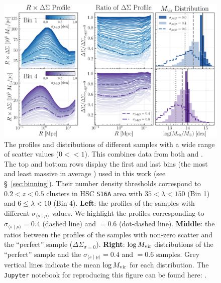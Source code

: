 \documentclass[fleqn,usenatbib,useAMS]{mnras}
\begin{document}
\begin{figure}
    \centering
    \includegraphics[width=\textwidth]{figure/fig_2}
    \caption{
        The \dsigma{} profiles and \mhalo{} distributions of different \topn{} samples with
        a wide range of scatter values ($0<$\scatterMhaloObsSym{}$<1$). 
        This combines data from both  and \smdpl{}. 
        The top and bottom rows display the first and last \topn{} bins (the most and least
        massive in average \mhalo{}) used in this work (see \S\ \ref{sec:binning}).
        Their number density thresholds correspond to $0.2 < z < 0.5$ \redm{} clusters in HSC
        \texttt{S16A} area with $35 < \lambda < 150$ (Bin 1) and $6 \leq \lambda < 10$ (Bin 4).
        \textbf{Left}: the \rdsigma{} profiles of the \topn{} samples with different
        $\sigma_{\langle s \mid \mu\rangle}$ values. 
        We highlight the profiles corresponding to $\sigma_{\langle s \mid \mu\rangle}=0.4$
        (dashed line) and $=0.6$ (dot-dashed line).
        \textbf{Middle}: the ratios between the \dsigma{} profiles of the \topn{} samples with
        non-zero scatter and the ``perfect'' sample ($\Delta\Sigma_{\sigma=0}$). 
        \textbf{Right}: $\log M_{\rm vir}$ distributions of the ``perfect'' \topn{} sample and
        the $\sigma_{\langle s \mid \mu\rangle}=0.4$ and $=0.6$ samples. 
        Grey vertical lines indicate the mean $\log M_{\rm vir}$ for each distribution.
        The \texttt{Jupyter} notebook for reproducing this figure can be found here:
        \href{https://github.com/dr-guangtou/jianbing/blob/master/notebooks/figure/fig2.ipynb}{\faGithub}.
    }
    \label{fig:mdpl2}
\end{figure}
\end{document}
